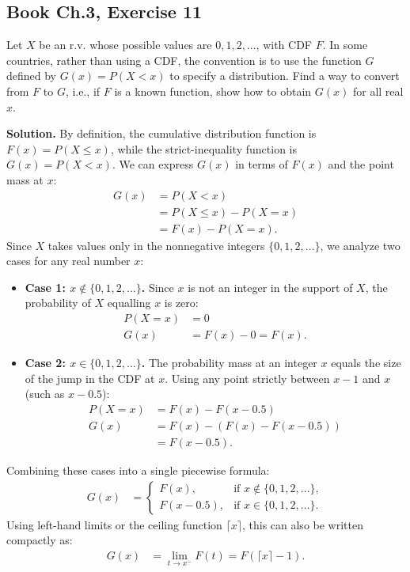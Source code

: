 \documentclass[11pt,a4paper]{article}
\begin{document}
\vspace{10pt}
\subsection{Book Ch.3, Exercise 11}
\begin{tcolorbox}[title={Book Ch.3, Exercise 11}]
Let $X$ be an r.v. whose possible values are $0, 1, 2, \dots$, with CDF $F$. In some countries, rather than using a CDF, the convention is to use the function $G$ defined by $G(x) = P(X < x)$ to specify a distribution. Find a way to convert from $F$ to $G$, i.e., if $F$ is a known function, show how to obtain $G(x)$ for all real $x$.
\end{tcolorbox}

\noindent \textbf{Solution.} By definition, the cumulative distribution function is $F(x) = P(X \le x)$, while the strict-inequality function is $G(x) = P(X < x)$. We can express $G(x)$ in terms of $F(x)$ and the point mass at $x$:
\begin{align*}
G(x) &= P(X < x) \\
&= P(X \le x) - P(X = x) \\
&= F(x) - P(X = x).
\end{align*}
Since $X$ takes values only in the nonnegative integers $\{0, 1, 2, \dots\}$, we analyze two cases for any real number $x$:
\begin{itemize}
    \item \textbf{Case 1: $x \notin \{0, 1, 2, \dots\}$.} Since $x$ is not an integer in the support of $X$, the probability of $X$ equalling $x$ is zero:
    \begin{align*}
    P(X = x) &= 0 \\
    G(x) &= F(x) - 0 = F(x).
    \end{align*}
    \item \textbf{Case 2: $x \in \{0, 1, 2, \dots\}$.} The probability mass at an integer $x$ equals the size of the jump in the CDF at $x$. Using any point strictly between $x-1$ and $x$ (such as $x - 0.5$):
    \begin{align*}
    P(X = x) &= F(x) - F(x - 0.5) \\
    G(x) &= F(x) - \left( F(x) - F(x - 0.5) \right) \\
    &= F(x - 0.5).
    \end{align*}
\end{itemize}
Combining these cases into a single piecewise formula:
\begin{align*}
G(x) &= \begin{cases}
F(x), & \text{if } x \notin \{0, 1, 2, \dots\}, \\[6pt]
F(x - 0.5), & \text{if } x \in \{0, 1, 2, \dots\}.
\end{cases}
\end{align*}
Using left-hand limits or the ceiling function $\lceil x \rceil$, this can also be written compactly as:
\begin{align*}
G(x) &= \lim_{t \to x^-} F(t) = F(\lceil x \rceil - 1).
\end{align*}
\end{document}
